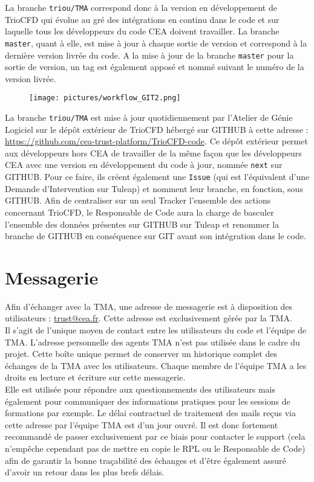 La branche \texttt{triou/TMA} correspond donc à la version en développement de TrioCFD qui évolue au gré des intégrations en continu dans le code et sur laquelle tous les développeurs du code CEA doivent travailler. La branche \texttt{master}, quant à elle, est mise à jour à chaque sortie de version et correspond à la dernière version livrée du code. A la mise à jour de la branche \texttt{master} pour la sortie de version, un tag est également apposé et nommé suivant le numéro de la version livrée.\\
\begin{figure}[H]
   \centering
   \texttt{[image: pictures/workflow\_GIT2.png]}
   \vspace*{0.2cm}
\end{figure}
\vspace{0.2cm}
La branche \texttt{triou/TMA} est mise à jour quotidiennement par l'Atelier de Génie Logiciel sur le dépôt extérieur de TrioCFD hébergé sur GITHUB à cette adresse : \url{https://github.com/cea-trust-platform/TrioCFD-code}. Ce dépôt extérieur permet aux développeurs hors CEA de travailler de la même façon que les développeurs CEA avec une version en développement du code à jour, nommée \texttt{next} sur GITHUB. Pour ce faire, ils créent également une \texttt{Issue} (qui est l'équivalent d'une Demande d'Intervention sur Tuleap) et nomment leur branche, en fonction, sous GITHUB. Afin de centraliser sur un seul Tracker l'ensemble des actions concernant TrioCFD, le Responsable de Code aura la charge de basculer l'ensemble des données présentes sur GITHUB sur Tuleap et renommer la branche de GITHUB en conséquence sur GIT avant son intégration dans le code.
\chapter{\label{chapitre:messagerie}Messagerie}

Afin d'échanger avec la TMA, une adresse de messagerie est \`a disposition des utilisateurs : \href{mailto:trust@cea.fr}{trust@cea.fr}. Cette adresse est exclusivement g\'er\'ee par la TMA.\\
Il s'agit de l'unique moyen de contact entre les utilisateurs du code et l'équipe de TMA. L'adresse personnelle des agents TMA n'est pas utilisée dans le cadre du projet. Cette boîte unique permet de conserver un historique complet des échanges de la TMA avec les utilisateurs. Chaque membre de l'équipe TMA a les droits en lecture et écriture sur cette messagerie.\\
Elle est utilisée pour répondre aux questionnements des utilisateurs mais également pour communiquer des informations pratiques pour les sessions de formations par exemple. Le délai contractuel de traitement des mails re\c cus via cette adresse par l'équipe TMA est d'un jour ouvré. Il est donc fortement recommandé de passer exclusivement par ce biais pour contacter le support (cela n'empêche cependant pas de mettre en copie le RPL ou le Responsable de Code) afin de garantir la bonne tra\c cabilité des échanges et d'être également assuré d'avoir un retour dans les plus brefs délais.


